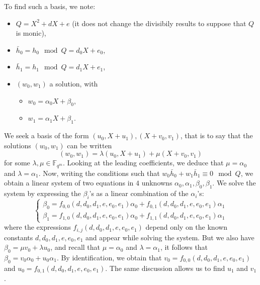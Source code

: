 \documentclass[a4paper,11pt]{article}
\theoremstyle{break}
\theoremstyle{sc}
\theoremstyle{definition}
\theoremstyle{remark}
\begin{document}
To find such a basis, we note:
\begin{itemize}
  \item $Q = X^2 + dX+ e$ (it does not
change the divisibily results to suppose that $Q$ is monic),
\item $\bar h_0 = h_0 \mod Q = d_0X+e_0$,
\item  $\bar h_1 = h_1 \mod Q = d_1X+e_1$, 
\item $(w_0, w_1)$ a solution, with
  \begin{itemize}
    \item $w_0=\alpha_0X+\beta_0$,
    \item $w_1=\alpha_1X+\beta_1$.
  \end{itemize}
\end{itemize}
We seek a basis of the form
$(u_0, X + u_1), (X+v_0, v_1)$, that is to say that the solutions $(w_0, w_1)$
can be written 
\[
  (w_0, w_1)=\lambda(u_0, X+u_1)+\mu(X+v_0, v_1)
\]
for some $\lambda, \mu\in\mathbb{F}_{q^m}$.
Looking at the leading coefficients, we deduce that $\mu =
\alpha_0$ and $\lambda=\alpha_1$. Now, writing the conditions such that $w_0\bar
h_0+w_1\bar h_1\equiv 0 \mod Q$, we obtain a linear system of two equations in
$4$ unknowns $\alpha_0, \alpha_1, \beta_0, \beta_1$. We solve the system by
expressing the $\beta_i$'s as a linear combination of the $\alpha_i$'s:
\[
  \begin{cases}
    \beta_0 = f_{0,0}(d, d_0, d_1, e, e_0, e_1)\alpha_0 + f_{0,1}(d, d_0, d_1, e,
    e_0, e_1)\alpha_1 \\
    \beta_1 = f_{1,0}(d, d_0, d_1, e, e_0, e_1)\alpha_0 + f_{1,1}(d, d_0, d_1, e,
    e_0, e_1)\alpha_1 
  \end{cases}
\]
where the expressions $f_{i, j}(d, d_0, d_1, e, e_0, e_1)$ depend only on the
known constants $d, d_0, d_1, e, e_0, e_1$ and appear while solving the system. But we also have $\beta_0 = \mu v_0
+ \lambda u_0$, and recall that $\mu = \alpha_0$ and $\lambda = \alpha_1$, it
follows that $\beta_0 = v_0\alpha_0+u_0\alpha_1$. By identification, we obtain
that $v_0 = f_{0,0}(d, d_0, d_1, e, e_0, e_1)$ and $u_0 = f_{0,1}(d, d_0, d_1,
e, e_0, e_1)$. The same discussion allows us to find $u_1$ and $v_1$.
\end{document}
